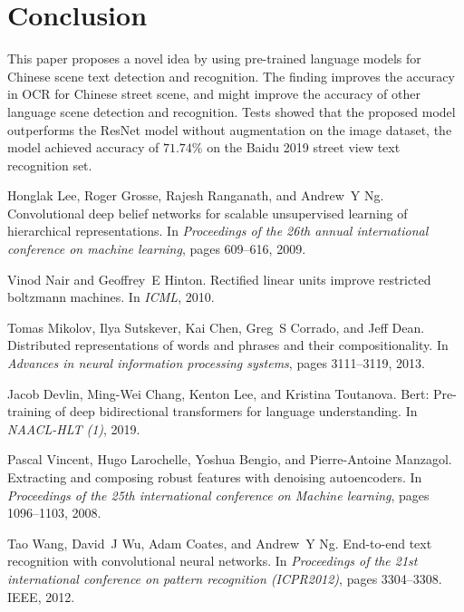 \documentclass[review]{cvpr}
\begin{document}
\section{Conclusion}

This paper proposes a novel idea by using pre-trained language models for Chinese scene text detection and recognition.
The finding improves the accuracy in OCR for Chinese street scene, and might improve the accuracy of other language scene detection and recognition.
Tests showed that the proposed model outperforms the ResNet model without augmentation on the image dataset,
the model achieved accuracy of $71.74\%$ on the Baidu 2019 street view text recognition set.



{\small

%
\begin{thebibliography}{10}

Honglak Lee, Roger Grosse, Rajesh Ranganath, and Andrew~Y Ng.
\newblock Convolutional deep belief networks for scalable unsupervised learning
  of hierarchical representations.
\newblock In {\em Proceedings of the 26th annual international conference on
  machine learning}, pages 609--616, 2009.


Vinod Nair and Geoffrey~E Hinton.
\newblock Rectified linear units improve restricted boltzmann machines.
\newblock In {\em ICML}, 2010.


Tomas Mikolov, Ilya Sutskever, Kai Chen, Greg~S Corrado, and Jeff Dean.
\newblock Distributed representations of words and phrases and their
  compositionality.
\newblock In {\em Advances in neural information processing systems}, pages
  3111--3119, 2013.


Jacob Devlin, Ming-Wei Chang, Kenton Lee, and Kristina Toutanova.
\newblock Bert: Pre-training of deep bidirectional transformers for language
  understanding.
\newblock In {\em NAACL-HLT (1)}, 2019.


Pascal Vincent, Hugo Larochelle, Yoshua Bengio, and Pierre-Antoine Manzagol.
\newblock Extracting and composing robust features with denoising autoencoders.
\newblock In {\em Proceedings of the 25th international conference on Machine
  learning}, pages 1096--1103, 2008.


Tao Wang, David~J Wu, Adam Coates, and Andrew~Y Ng.
\newblock End-to-end text recognition with convolutional neural networks.
\newblock In {\em Proceedings of the 21st international conference on pattern
  recognition (ICPR2012)}, pages 3304--3308. IEEE, 2012.



\end{thebibliography}}
\end{document}
